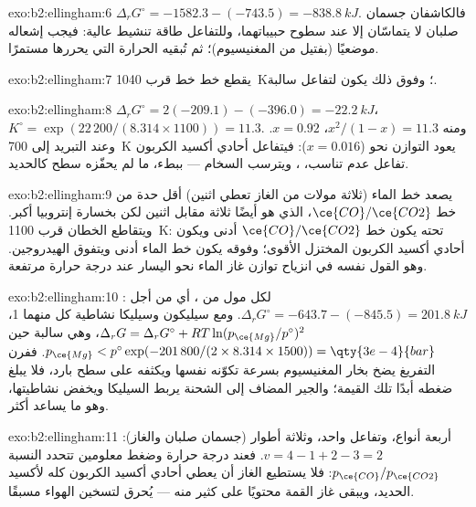 \begin{solution}{exo:b2:ellingham:6}
$\Delta_r G^\circ = -1582.3 - (-743.5) = \qty{-838.8}{kJ}$. فالكاشفان
جسمان صلبان لا يتماسّان إلا عند سطوح حبيباتهما، وللتفاعل
طاقة تنشيط عالية: فيجب إشعاله موضعيًا (بفتيل من المغنيسيوم)؛
ثم تُبقيه الحرارة التي يحررها مستمرًا.
\end{solution}

\begin{solution}{exo:b2:ellingham:7}
يقطع خط  خط  قرب
\qty{1040}{K}؛ وفوق ذلك يكون لتفاعل  
سالبة.
\end{solution}

\begin{solution}{exo:b2:ellingham:8}
$\Delta_r G^\circ = 2(-209.1) - (-396.0) = \qty{-22.2}{kJ}$، $K^\circ =
\exp(22\,200/(8.314 \times 1100)) = 11.3$. ومنه $x^2/(1 - x) = 11.3$، $x =
0.92$. وعند التبريد إلى \qty{700}{K} يعود التوازن نحو 
($x = 0.016$): فيتفاعل أحادي أكسيد الكربون تفاعل عدم تناسب، ، ويترسب
السخام --- ببطء، ما لم يحفّزه سطح كالحديد.
\end{solution}

\begin{solution}{exo:b2:ellingham:9}
يصعد خط الماء (ثلاثة مولات من الغاز تعطي اثنين) أقل حدة من
خط $\ce{CO}/\ce{CO2}$، الذي هو أيضًا ثلاثة مقابل اثنين لكن بخسارة إنتروبيا أكبر. ويتقاطع
الخطان قرب \qty{1100}{K}: تحته يكون خط $\ce{CO}/\ce{CO2}$ أدنى ويكون
أحادي أكسيد الكربون المختزل الأقوى؛ وفوقه يكون خط الماء أدنى ويتفوق
الهيدروجين. وهو القول نفسه في انزياح توازن غاز
الماء  نحو اليسار عند درجة حرارة مرتفعة.
\end{solution}

\begin{solution}{exo:b2:ellingham:10}
لكل مول من ، أي من أجل : $\Delta_r
G^\circ = -643.7 - (-845.5) = \qty{+201.8}{kJ}$. ومع سيليكون وسيليكا
نشاطية كل منهما 1، $\Delta_r G = \Delta_r G^\circ + RT\ln(p_{\ce{Mg}}/p^\circ)^2$، وهي سالبة
حين $p_{\ce{Mg}} < p^\circ\exp(-201\,800/(2 \times 8.314 \times 1500)) =
\qty{3e-4}{bar}$. ففرن التفريغ يضخ بخار المغنيسيوم بسرعة تكوّنه نفسها
ويكثفه على سطح بارد، فلا يبلغ ضغطه أبدًا
تلك القيمة؛ والجير المضاف إلى الشحنة يربط السيليكا ويخفض نشاطيتها،
وهو ما يساعد أكثر.
\end{solution}

\begin{solution}{exo:b2:ellingham:11}
أربعة أنواع، وتفاعل واحد، وثلاثة أطوار (جسمان صلبان والغاز): $v = 4 - 1 +
2 - 3 = 2$. فعند درجة حرارة وضغط معلومين تتحدد النسبة $p_{\ce{CO}}/p_{\ce{CO2}}$:
فلا يستطيع الغاز أن يعطي أحادي أكسيد الكربون كله لأكسيد الحديد،
ويبقى غاز القمة محتويًا على كثير منه --- يُحرق لتسخين
الهواء مسبقًا.
\end{solution}

